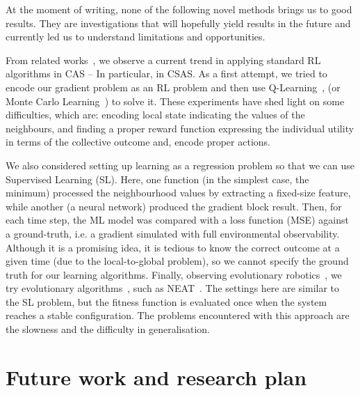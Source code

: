 \documentclass[conference]{IEEEtran}
\begin{document}
At the moment of writing, none of the following novel methods brings us to good results. They are investigations that will hopefully yield results in the future and currently led us to understand limitations and opportunities.

From related works~\cite{DAngelo2019}, we observe a current trend in applying standard RL algorithms in CAS -- In particular, in CSAS.
%
As a first attempt, we tried to encode our gradient problem as an RL problem and then use Q-Learning~\cite{DBLP:journals/ras/Krose95}, (or Monte Carlo Learning~\cite{DBLP:conf/nips/Thrun99}) to solve it.
%
These experiments have shed light on some difficulties, which are: encoding local state indicating the values of the neighbours, and finding a proper reward function expressing the individual utility in terms of the collective outcome and, encode proper actions. 

We also considered setting up learning as a regression problem so that we can use Supervised Learning (SL).
%
Here, one function (in the simplest case, the minimum) processed the neighbourhood values by extracting a fixed-size feature, while another (a neural network) produced the gradient block result.
%
Then, for each time step, the ML model was compared with a loss function (MSE) against a ground-truth, i.e. a gradient simulated with full environmental observability.
%
%
Although it is a promising idea, it is tedious to know the correct outcome at a given time (due to the local-to-global problem), so we cannot specify the ground truth for our learning algorithms.
%
Finally, observing evolutionary robotics~\cite{DBLP:journals/firai/DoncieuxBME15}, we try evolutionary algorithms~\cite{DBLP:books/daglib/0087893}, such as NEAT~\cite{DBLP:journals/ec/StanleyM02}.
%
The settings here are similar to the SL problem, but the fitness function is evaluated once when the system reaches a stable configuration.
%
%
The problems encountered with this approach are the slowness and the difficulty in generalisation.
%
\section{Future work and research plan}
%
%
%
\end{document}
